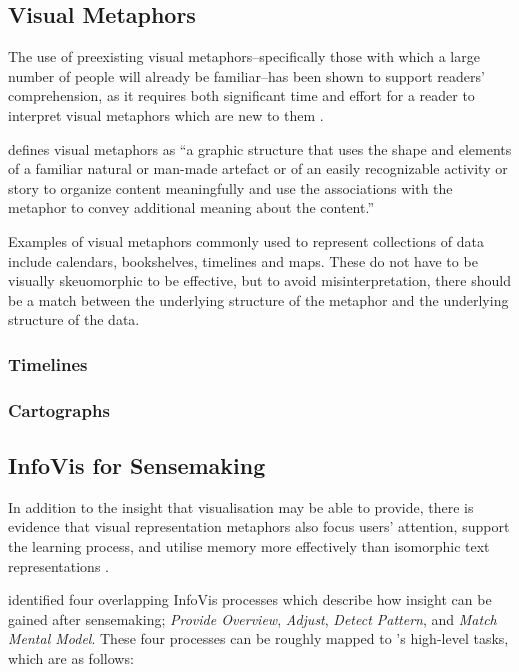 \subsection{Visual Metaphors}

The use of preexisting visual metaphors--specifically those with which a large number of people will already be familiar--has been shown to support readers' comprehension, as it requires both significant time and effort for a reader to interpret visual metaphors which are new to them \citep{PreconceptionsVisualMetaphors}.

\citeauthor{AComparisonBetweenConceptMaps} defines visual metaphors as ``a graphic structure that uses the shape and elements of a familiar natural or man-made artefact or of an easily recognizable activity or story to organize content meaningfully and use the associations with the metaphor to convey additional meaning about the content.'' \citep[p.203]{AComparisonBetweenConceptMaps}

Examples of visual metaphors commonly used to represent collections of data include calendars, bookshelves, timelines and maps. These do not have to be visually skeuomorphic to be effective, but to avoid misinterpretation, there should be a match between the underlying structure of the metaphor and the underlying structure of the data.

\subsubsection{Timelines}

\subsubsection{Cartographs}

\subsection{InfoVis for Sensemaking}

In addition to the insight that visualisation may be able to provide, there is evidence that visual representation metaphors also focus users' attention, support the learning process, and utilise memory more effectively than isomorphic text representations \citep{LearningFromArchitects}.

\citet{UnderstandingAndCharacterizingInsights} identified four overlapping InfoVis processes which describe how insight can be gained after sensemaking; \textit{Provide Overview}, \textit{Adjust}, \textit{Detect Pattern}, and \textit{Match Mental Model}. These four processes can be roughly mapped to \citeauthor{TheEyesHaveIt}'s high-level tasks, which are as follows:

